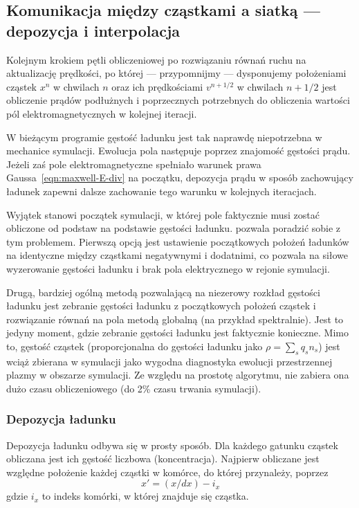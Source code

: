 \subsection{Komunikacja między cząstkami a siatką --- depozycja i interpolacja}

Kolejnym krokiem pętli obliczeniowej po rozwiązaniu równań ruchu na
aktualizację prędkości, po której --- przypomnijmy --- dysponujemy położeniami
cząstek $x^n$ w chwilach $n$ oraz ich prędkościami $v^{n+1/2}$ w chwilach
$n+1/2$  jest obliczenie prądów podłużnych i
poprzecznych potrzebnych do obliczenia wartości pól elektromagnetycznych w
kolejnej iteracji.

W bieżącym programie gęstość ładunku jest tak naprawdę niepotrzebna w
mechanice symulacji. Ewolucja pola następuje poprzez znajomość gęstości prądu.
Jeżeli zaś pole elektromagnetyczne spełniało warunek
prawa Gaussa~\ref{eqn:maxwell-E-div} na początku, depozycja prądu w sposób
zachowujący ładunek zapewni dalsze zachowanie tego warunku w kolejnych
iteracjach.~\cite{bunemanvillasenor}

Wyjątek stanowi początek symulacji, w której pole faktycznie musi zostać
obliczone od podstaw na podstawie gęstości ładunku. \pythonpic{} pozwala
poradzić sobie z tym problemem. Pierwszą opcją jest ustawienie początkowych
położeń ładunków na identyczne między cząstkami negatywnymi i dodatnimi, co
pozwala na siłowe wyzerowanie gęstości ładunku i brak pola elektrycznego w
rejonie symulacji.

Drugą, bardziej ogólną metodą pozwalającą na niezerowy rozkład gęstości
ładunku jest zebranie gęstości ładunku z początkowych położeń cząstek i
rozwiązanie równań na pola metodą globalną (na przykład spektralnie). Jest
to jedyny moment, gdzie zebranie gęstości ładunku jest faktycznie konieczne.
Mimo to, gęstość cząstek (proporcjonalna do gęstości ładunku jako $\rho =
\sum_s q_s n_s$) jest wciąż zbierana w symulacji jako wygodna diagnostyka
ewolucji przestrzennej plazmy w obszarze symulacji. Ze względu na prostotę
algorytmu, nie zabiera ona dużo czasu obliczeniowego (do
2\% czasu trwania symulacji).

\subsubsection{Depozycja ładunku}

 Depozycja ładunku odbywa się w prosty sposób. Dla każdego gatunku
cząstek obliczana jest ich gęstość liczbowa (koncentracja). Najpierw
obliczane jest względne położenie każdej cząstki w komórce, do której
przynależy, poprzez
\begin{equation}
x' = (x/dx) - i_x
\label{eqn:relative-position}
\end{equation}
gdzie $i_x$ to indeks komórki, w której znajduje się cząstka.


